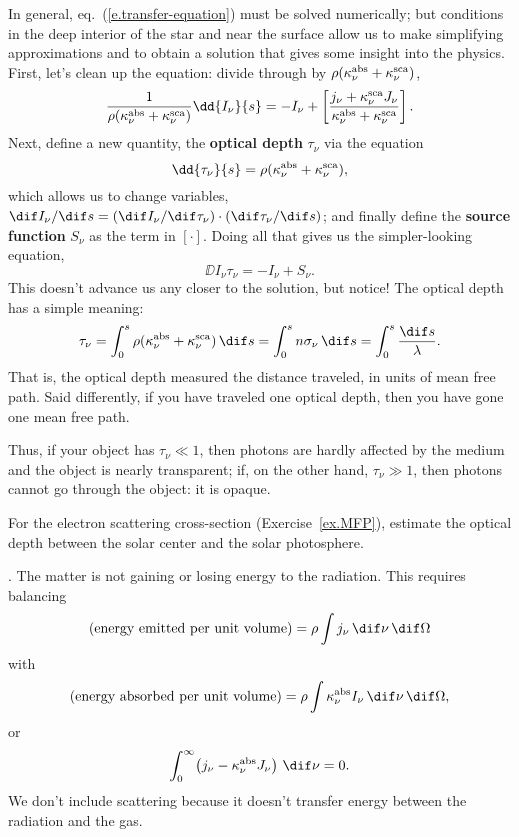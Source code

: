 In general, eq.~(\ref{e.transfer-equation}) must be solved numerically; but conditions in the deep interior of the star and near the surface allow us to make simplifying approximations and to obtain a solution that gives some insight into the physics. First, let's clean up the equation: divide through by $\rho(\kappa_\nu^{\mathrm{abs}} + \kappa_\nu^{\mathrm{sca}})$,
\[
	\frac{1}{\rho(\kapabs+\kapscat)}\dd{I_{\nu}}{s} = -I_{\nu} + \left[\frac{j_{\nu} + \kapscat J_{\nu}}{\kapabs + \kapscat}\right].
\]
Next, define a new quantity, the \textbf{optical depth} $\tau_{\nu}$ via the equation
\[
	\dd{\tau_{\nu}}{s} = \rho(\kapabs+\kapscat),
\]
which allows us to change variables, $\dif I_{\nu}/\dif s = (\dif I_{\nu}/\dif\tau_{\nu})\cdot(\dif\tau_{\nu}/\dif s)$; and finally define the \textbf{source function} $S_{\nu}$ as the term in $\left[\cdot\right]$. Doing all that gives us the simpler-looking equation,
\[
	\DD{I_{\nu}}{\tau_{\nu}} = -I_{\nu} + S_{\nu}.
\]
This doesn't advance us any closer to the solution, but notice! The optical depth has a simple meaning:
\[
	\tau_{\nu} = \int_{0}^{s} \rho(\kapabs+\kapscat)\,\dif s = \int_{0}^{s} n\sigma_{\nu}\,\dif s = \int_{0}^{s} \frac{\dif s}{\lambda}.
\]
That is, the optical depth measured the distance traveled, in units of mean free path. Said differently, if you have traveled one optical depth, then you have gone one mean free path.

Thus, if your object has $\tau_{\nu}\ll 1$, then photons are hardly affected by the medium and the object is nearly transparent; if, on the other hand, $\tau_{\nu} \gg 1$, then photons cannot go through the object: it is opaque.

\begin{exercisebox}
For the electron scattering cross-section (Exercise~\ref{ex.MFP}), estimate the optical depth between the solar center and the solar photosphere.
\end{exercisebox}

. 
The matter is not gaining or losing energy to the radiation. This requires balancing
\[ \left(\textrm{energy emitted per unit volume}\right) = \rho\int j_{\nu}\,\dif\nu\,\dif\Omega\] 
with
\[ \left(\textrm{energy absorbed per unit volume}\right) = \rho\int \kapabs I_{\nu}\,\dif\nu\,\dif\Omega,\]
or
\begin{equation}\label{e.rad-equil}
\int_{0}^{\infty}\! \left(j_{\nu} - \kapabs J_{\nu}\right)\,\dif\nu = 0.
\end{equation}
We don't include scattering because it doesn't transfer energy between the radiation and the gas.

